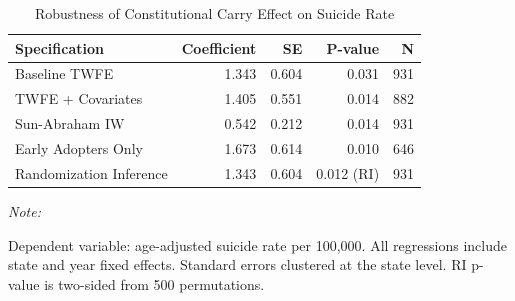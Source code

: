 \begin{table}[!h]
\centering
\caption{\label{tab:robustness}Robustness of Constitutional Carry Effect on Suicide Rate}
\centering
\begin{threeparttable}
\begin{tabular}[t]{lrrrr}
\toprule
Specification & Coefficient & SE & P-value & N\\
\midrule
Baseline TWFE & 1.343 & 0.604 & 0.031 & 931\\
TWFE + Covariates & 1.405 & 0.551 & 0.014 & 882\\
Sun-Abraham IW & 0.542 & 0.212 & 0.014 & 931\\
Early Adopters Only & 1.673 & 0.614 & 0.010 & 646\\
Randomization Inference & 1.343 & 0.604 & 0.012 (RI) & 931\\
\bottomrule
\end{tabular}
\begin{tablenotes}
\item \textit{Note: } 
\item Dependent variable: age-adjusted suicide rate per 100,000. All regressions include state and year fixed effects. Standard errors clustered at the state level. RI p-value is two-sided from 500 permutations.
\end{tablenotes}
\end{threeparttable}
\end{table}
